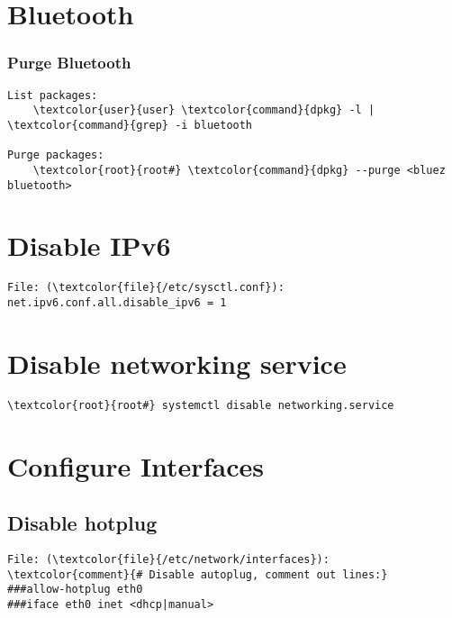 \documentclass[10pt, a4paper, onecolumn, openany]{book} %
\begin{document}
\section{Bluetooth}
\subsubsection{Purge Bluetooth}
\begin{Verbatim}[commandchars=\\\{\}]
List packages:
    \textcolor{user}{user} \textcolor{command}{dpkg} -l | \textcolor{command}{grep} -i bluetooth

Purge packages:
    \textcolor{root}{root#} \textcolor{command}{dpkg} --purge <bluez bluetooth>
\end{Verbatim}

\section{Disable IPv6}
\begin{Verbatim}[commandchars=\\\{\}]
File: (\textcolor{file}{/etc/sysctl.conf}):
net.ipv6.conf.all.disable_ipv6 = 1
\end{Verbatim}

\section{Disable networking service}
\begin{Verbatim}[commandchars=\\\{\}]
    \textcolor{root}{root#} systemctl disable networking.service
\end{Verbatim}

\section{Configure Interfaces}
\subsection{Disable hotplug}
\begin{Verbatim}[commandchars=\\\{\}]
File: (\textcolor{file}{/etc/network/interfaces}):
\textcolor{comment}{# Disable autoplug, comment out lines:}
###allow-hotplug eth0
###iface eth0 inet <dhcp|manual>
\end{Verbatim}
\end{document}

